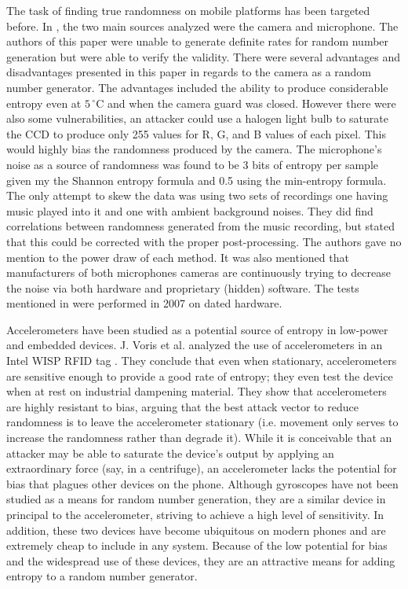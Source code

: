 \documentclass[conference]{IEEEtran}
\begin{document}
The task of finding true randomness on mobile platforms has been targeted before. In \cite{Krhovjak}, the two main sources analyzed were the 
camera and microphone. The authors of this paper were unable to generate definite rates for random number generation but were able to verify the validity.
There were several advantages and disadvantages presented in this paper in regards to the camera as a random number generator. The advantages included the
ability to produce considerable entropy even at $5\,^{\circ}\mathrm{C}$ and when the camera guard was closed. However there were also some vulnerabilities, 
an attacker could use a halogen light bulb to saturate the CCD to produce only 255 values for R, G, and B values of each pixel. This would highly bias the randomness produced by the camera. 
The microphone's noise as a source of randomness was found to be 3 bits of entropy per sample given my the Shannon entropy formula and 0.5 using the min-entropy 
formula. The only attempt to skew the data was using two sets of recordings one having music played into it and one with ambient background noises. They did
find correlations between randomness generated from the music recording, but stated that this could be corrected with the proper post-processing. The authors
gave no mention to the power draw of each method. It was also mentioned that manufacturers of both microphones cameras are continuously trying to decrease the noise
via both hardware and proprietary (hidden) software. The tests mentioned in \cite{Krhovjak} were performed in 2007 on dated hardware.

Accelerometers have been studied as a potential source of entropy in low-power and embedded devices.  J. Voris et al. analyzed the use of accelerometers in an
Intel WISP RFID tag \cite{voris}.  They conclude that even when stationary, accelerometers are sensitive enough to provide a good rate of entropy; they even
test the device when at rest on industrial dampening material.  They show that accelerometers are highly resistant to bias, arguing that the best attack
vector to reduce randomness is to leave the accelerometer stationary (i.e. movement only serves to increase the randomness rather than degrade it).  While it is
conceivable that an attacker may be able to saturate the device's output by applying an extraordinary force (say, in a centrifuge), an accelerometer lacks the
potential for bias that plagues other devices on the phone.  Although gyroscopes have not been studied as a means for random number generation, they are a
similar device in principal to the accelerometer, striving to achieve a high level of sensitivity.  In addition, these two devices have become ubiquitous on
modern phones and are extremely cheap to include in any system.  Because of the low potential for bias and the widespread use of these devices, they are an
attractive means for adding entropy to a random number generator.
\end{document}
